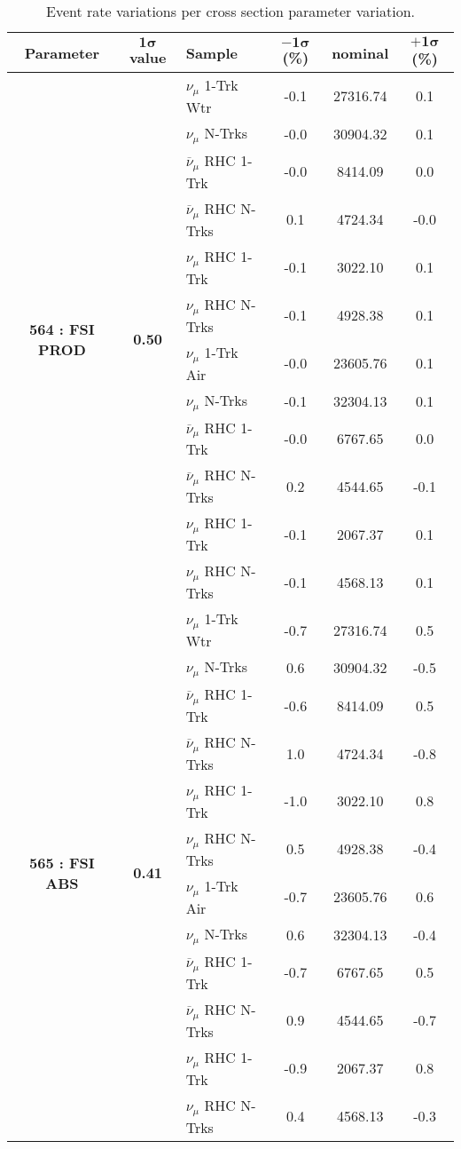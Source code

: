 \addtocounter{table}{-1}
\newpage
\begin{table}[ht!]
\centering
\begin{tabular}{ c  c  l  c  c  c }
\midrule[1.3pt]
\textbf{Parameter} & \textbf{$\mathbf{1\sigma}$ value} & \textbf{Sample} & \textbf{$\mathbf{-1\sigma}$ (\%)}  &  \textbf{nominal}  &  \textbf{$\mathbf{+1\sigma}$ (\%)} \\
\midrule[1.3pt]
\multirow{12}{*}{\textbf{564 : FSI PROD}} & \multirow{12}{*}{\textbf{0.50}} & $\nu_\mu$ 1-Trk Wtr &   -0.1 &  27316.74 &   0.1 \\ 
 &  & $\nu_\mu$ N-Trks &   -0.0 &  30904.32 &   0.1 \\ 
 &  & $\overline{\nu}_\mu$ RHC 1-Trk &   -0.0 &  8414.09 &   0.0 \\ 
 &  & $\overline{\nu}_\mu$ RHC N-Trks &   0.1 &  4724.34 &   -0.0 \\ 
 &  & $\nu_\mu$ RHC 1-Trk &   -0.1 &  3022.10 &   0.1 \\ 
 &  & $\nu_\mu$ RHC N-Trks &   -0.1 &  4928.38 &   0.1 \\ 
 &  & $\nu_\mu$ 1-Trk Air &   -0.0 &  23605.76 &   0.1 \\ 
 &  & $\nu_\mu$ N-Trks &   -0.1 &  32304.13 &   0.1 \\ 
 &  & $\overline{\nu}_\mu$ RHC 1-Trk &   -0.0 &  6767.65 &   0.0 \\ 
 &  & $\overline{\nu}_\mu$ RHC N-Trks &   0.2 &  4544.65 &   -0.1 \\ 
 &  & $\nu_\mu$ RHC 1-Trk &   -0.1 &  2067.37 &   0.1 \\ 
 &  & $\nu_\mu$ RHC N-Trks &   -0.1 &  4568.13 &   0.1 \\ 
\midrule[1.3pt]
\multirow{12}{*}{\textbf{565 : FSI ABS}} & \multirow{12}{*}{\textbf{0.41}} & $\nu_\mu$ 1-Trk Wtr &   -0.7 &  27316.74 &   0.5 \\ 
 &  & $\nu_\mu$ N-Trks &   0.6 &  30904.32 &   -0.5 \\ 
 &  & $\overline{\nu}_\mu$ RHC 1-Trk &   -0.6 &  8414.09 &   0.5 \\ 
 &  & $\overline{\nu}_\mu$ RHC N-Trks &   1.0 &  4724.34 &   -0.8 \\ 
 &  & $\nu_\mu$ RHC 1-Trk &   -1.0 &  3022.10 &   0.8 \\ 
 &  & $\nu_\mu$ RHC N-Trks &   0.5 &  4928.38 &   -0.4 \\ 
 &  & $\nu_\mu$ 1-Trk Air &   -0.7 &  23605.76 &   0.6 \\ 
 &  & $\nu_\mu$ N-Trks &   0.6 &  32304.13 &   -0.4 \\ 
 &  & $\overline{\nu}_\mu$ RHC 1-Trk &   -0.7 &  6767.65 &   0.5 \\ 
 &  & $\overline{\nu}_\mu$ RHC N-Trks &   0.9 &  4544.65 &   -0.7 \\ 
 &  & $\nu_\mu$ RHC 1-Trk &   -0.9 &  2067.37 &   0.8 \\ 
 &  & $\nu_\mu$ RHC N-Trks &   0.4 &  4568.13 &   -0.3 \\ 
\midrule[1.3pt]
\end{tabular}
\centering
\caption*{Event rate variations per cross section parameter variation.}
\end{table}
